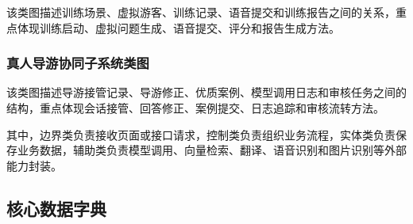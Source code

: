 该类图描述训练场景、虚拟游客、训练记录、语音提交和训练报告之间的关系，重点体现训练启动、虚拟问题生成、语音提交、评分和报告生成方法。


\subsubsection{真人导游协同子系统类图}

该类图描述导游接管记录、导游修正、优质案例、模型调用日志和审核任务之间的结构，重点体现会话接管、回答修正、案例提交、日志追踪和审核流转方法。


其中，边界类负责接收页面或接口请求，控制类负责组织业务流程，实体类负责保存业务数据，辅助类负责模型调用、向量检索、翻译、语音识别和图片识别等外部能力封装。

\subsection{核心数据字典}

